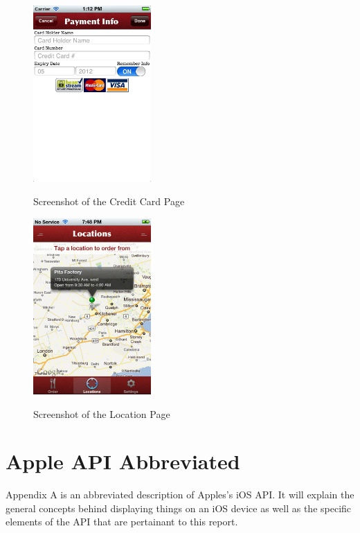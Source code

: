\documentclass[se]{uw-wkrpt}
\begin{document}
\begin{figure}[h!]
  \caption{Screenshot of the Credit Card Page}
  \centering
    \includegraphics[width=0.4\textwidth]{creditCardPage}
  \label{fig:Credit Card Page}
\end{figure}

\begin{figure}[h!]
  \caption{Screenshot of the Location Page}
  \centering
    \includegraphics[width=0.4\textwidth]{locationPage}
  \label{fig:Location Pageg}
\end{figure}

\appendix

\section{Apple API Abbreviated}

Appendix A is an abbreviated description of Apples's iOS API. It
will explain the general concepts behind displaying things on
an iOS device as well as the specific elements of the API that
are pertainant to this report.
\end{document}

